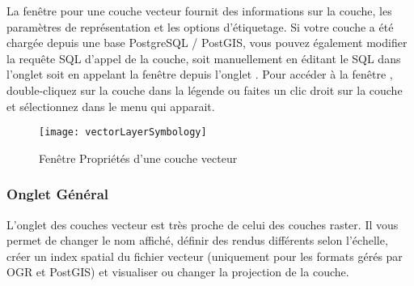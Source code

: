 La fenêtre  pour une couche vecteur fournit des informations sur la couche, les paramètres de représentation et les options d'étiquetage. Si votre couche a été chargée depuis une base PostgreSQL / PostGIS, vous pouvez également modifier la requête SQL d'appel de la couche, soit manuellement en éditant le SQL dans l'onglet  soit en appelant la fenêtre  depuis l'onglet . Pour accéder à la fenêtre , double-cliquez sur la couche dans la légende ou faites un clic droit sur la couche et sélectionnez  dans le menu qui apparait.

\begin{figure}[H]
  \begin{center}
  \caption{Fenêtre Propriétés d'une couche vecteur \nixcaption}\label{fig:vector_symbology}\smallskip
  \texttt{[image: vectorLayerSymbology]}
\end{center}
\end{figure}

\subsubsection{Onglet Général}\label{vectorgeneraltab}
L'onglet  des couches vecteur est très proche de celui des couches raster. Il vous permet de changer le nom affiché, définir des rendus différents selon l'échelle, créer un index spatial du fichier vecteur (uniquement pour les formats gérés par OGR et PostGIS) et visualiser ou changer la projection de la couche.

